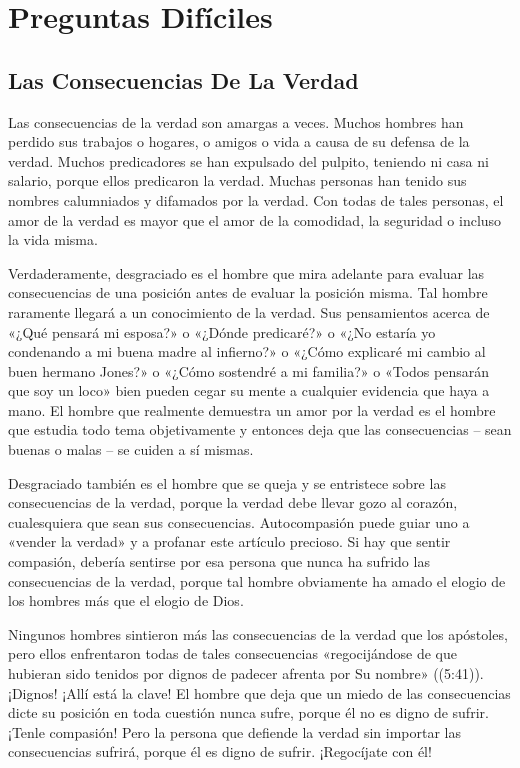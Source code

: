 \documentclass[12pt, twoside, openright]{book}
\begin{document}
\chapter{Preguntas Difíciles}

\section{Las Consecuencias De La Verdad}
Las consecuencias de la verdad son amargas a veces. Muchos hombres han perdido sus trabajos o hogares, o amigos o vida a causa de su defensa de la verdad. Muchos predicadores se han expulsado del pulpito, teniendo ni casa ni salario, porque ellos predicaron la verdad. Muchas personas han tenido sus nombres calumniados y difamados por la verdad. Con todas de tales personas, el amor de la verdad es mayor que el amor de la comodidad, la seguridad o incluso la vida misma. 

Verdaderamente, desgraciado es el hombre que mira adelante para evaluar las consecuencias de una posición antes de evaluar la posición misma. Tal hombre raramente llegará a un conocimiento de la verdad. Sus pensamientos acerca de «¿Qué pensará mi esposa?» o «¿Dónde predicaré?» o «¿No estaría yo condenando a mi buena madre al infierno?» o «¿Cómo explicaré mi cambio al buen hermano Jones?» o «¿Cómo sostendré a mi familia?» o «Todos pensarán que soy un loco» bien pueden cegar su mente a cualquier evidencia que haya a mano. El hombre que realmente demuestra un amor por la verdad es el hombre que estudia todo tema objetivamente y entonces deja que las consecuencias – sean buenas o malas – se cuiden a sí mismas.

Desgraciado también es el hombre que se queja y se entristece sobre las consecuencias de la verdad, porque la verdad debe llevar gozo al corazón, cualesquiera que sean sus consecuencias. Autocompasión puede guiar uno a «vender la verdad» y a profanar este artículo precioso. Si hay que sentir compasión, debería sentirse por esa persona que nunca ha sufrido las consecuencias de la verdad, porque tal hombre obviamente ha amado el elogio de los hombres más que el elogio de Dios.

Ningunos hombres sintieron más las consecuencias de la verdad que los apóstoles, pero ellos enfrentaron todas de tales consecuencias «regocijándose de que hubieran sido tenidos por dignos de padecer afrenta por Su nombre» ((5:41)). ¡Dignos! ¡Allí está la clave! El hombre que deja que un miedo de las consecuencias dicte su posición en toda cuestión nunca sufre, porque él no es digno de sufrir. ¡Tenle compasión! Pero la persona que defiende la verdad sin importar las consecuencias sufrirá, porque él es digno de sufrir. ¡Regocíjate con él! 
\end{document}

